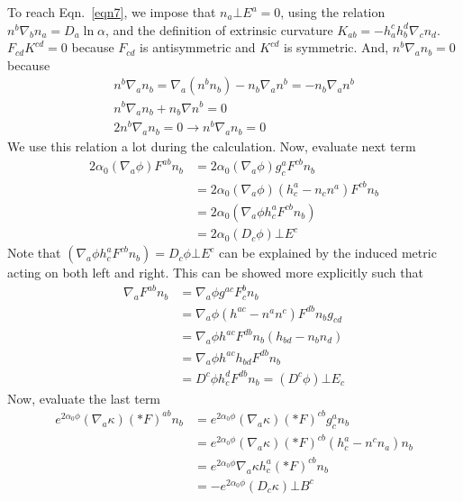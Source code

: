\documentclass[prd]{revtex4}
\begin{document}
To reach Eqn.~\ref{eqn7}, we impose that $n_a \bot E^a = 0$, using the relation $n^b \nabla_b n_a = D_a \ln \alpha$, and the definition of extrinsic curvature $K_{ab} = -h_a^c h_b^d \nabla_c n_d$. $F_{cd} K^{cd} = 0$ because $F_{cd}$ is antisymmetric and $K^{cd}$ is symmetric. And, $n^b \nabla_a n_b = 0$ because
\begin{align}
n^b \nabla_a n_b = \nabla_a (n^b n_b) - n_b \nabla_a n^b = -n_b \nabla_a n^b \nonumber \\
n^b \nabla_a n_b + n_b \nabla n^b = 0 \nonumber \\
2 n^b \nabla_a n_b = 0 \rightarrow n^b \nabla_a n_b = 0 \nonumber
\end{align}
We use this relation a lot during the calculation. Now, evaluate next term
\begin{align}
2 \alpha_0 (\nabla_a \phi) F^{ab} n_b &= 2\alpha_0 (\nabla_a \phi) g_c^a F^{cb} n_b \nonumber \\
							 &= 2\alpha_0 (\nabla_a \phi) (h_c^{a} -n_c n^a) F^{cb} n_b \nonumber \\
							 &= 2\alpha_0 (\nabla_a \phi h_c^a F^{cb} n_b) \nonumber \\
							 &= 2\alpha_0 (D_c \phi) \bot E^c
\end{align}
Note that $(\nabla_a \phi h_c^a F^{cb} n_b) = D_c\phi \bot E^c$ can be explained by the induced metric acting on both left and right. This can be showed more explicitly such that
\begin{align}
\nabla_a F^{ab} n_b & = \nabla_a \phi g^{ac} F_c^b n_b \nonumber \\
			        & = \nabla_a \phi (h^{ac} -n^a n^c) F^{db} n_b g_{cd} \nonumber \\
			        & = \nabla_a \phi h^{ac} F^{db} n_b (h_{bd} - n_b n_d ) \nonumber \\
			        & = \nabla_a \phi h^{ac} h_{bd} F^{db} n_b \nonumber \\
			        & = D^c \phi h_c^d F^{db} n_b = (D^c \phi) \bot E_c \nonumber
\end{align}
Now, evaluate the last term
\begin{align}
e^{2 \alpha_0 \phi} (\nabla_a \kappa) (\ast F)^{ab} n_b &= e^{2 \alpha_0 \phi} (\nabla_a \kappa) (\ast F)^{cb} g_c^a n_b \nonumber \\
										    &= e^{2 \alpha_0 \phi} (\nabla_a \kappa) (\ast F)^{cb} (h_c^a - n^c n_a) n_b \nonumber \\
										    &=e^{2 \alpha_0 \phi} \nabla_a \kappa h_c^a (\ast F)^{cb} n_b \nonumber \\
										    &=-e^{2 \alpha_0 \phi} (D_c \kappa) \bot B^c
\end{align}
\end{document}
